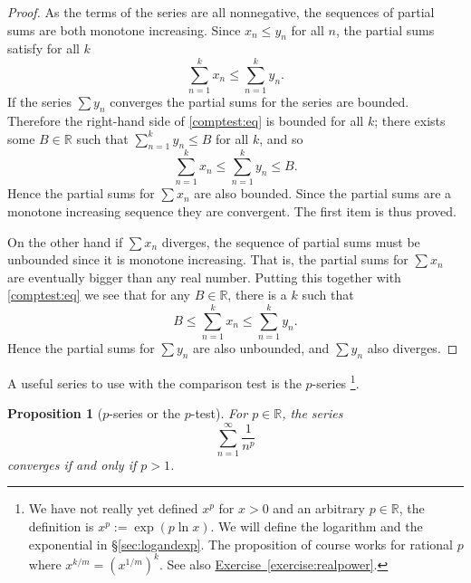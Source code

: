 \documentclass[12pt]{book}
\newcommand{\R}{{\mathbb{R}}}
\theoremstyle{plain}
\newtheorem{prop}[thm]{Proposition}
\theoremstyle{remark}
\theoremstyle{definition}
\theoremstyle{exercise}
\theoremstyle{example}
\newcommand{\sectionref}[1]{\hyperref[#1]{\S\ref*{#1}}}
\newcommand{\exerciseref}[1]{\hyperref[#1]{Exercise~\ref*{#1}}}
\begin{document}
\begin{proof}
As the terms of the series are all nonnegative, the sequences of
partial sums are both monotone increasing.
Since $x_n \leq y_n$ for all $n$, the partial sums
satisfy for all $k$
\begin{equation} \label{comptest:eq}
\sum_{n=1}^k x_n \leq \sum_{n=1}^k y_n .
\end{equation}
If the series $\sum y_n$ converges the partial sums for the series
are bounded.  Therefore the right-hand side of \eqref{comptest:eq}
is bounded for all $k$; there exists some $B \in \R$ such that
$\sum_{n=1}^k y_n \leq B$ for all $k$, and so
\begin{equation*}
\sum_{n=1}^k x_n \leq \sum_{n=1}^k y_n \leq B.
\end{equation*}
Hence the partial sums for $\sum x_n$
are also bounded.  Since the partial sums are a monotone increasing sequence
they are convergent.  The first item is thus proved.

On the other hand if $\sum x_n$ diverges, the sequence of partial sums
must be unbounded since it is monotone increasing.  That is, the partial
sums for $\sum x_n$ are eventually bigger than any real number.  Putting this
together with \eqref{comptest:eq} we see that for any $B \in
\R$, there is a $k$ such that 
\begin{equation*}
B \leq \sum_{n=1}^k x_n \leq \sum_{n=1}^k y_n .
\end{equation*}
Hence the partial sums for $\sum y_n$ are also unbounded, and $\sum
y_n$ also diverges.
\end{proof}

A useful series to use with the comparison test is the
$p$-series%
\footnote{We have not really yet defined $x^p$ for $x > 0$ and
an arbitrary $p \in \R$, the definition is $x^p := \exp ( p \ln x )$.
We will define the logarithm and the exponential in \sectionref{sec:logandexp}.
The proposition of course works for rational $p$
where $x^{k/m} = {(x^{1/m})}^{k}$.  See also \exerciseref{exercise:realpower}.}.

\begin{prop}[$p$-series or the $p$-test]
For $p \in \R$, 
the series
\begin{equation*}
\sum_{n=1}^\infty \frac{1}{n^p}
\end{equation*}
converges if and only if $p > 1$.
\end{prop}
\end{document}
